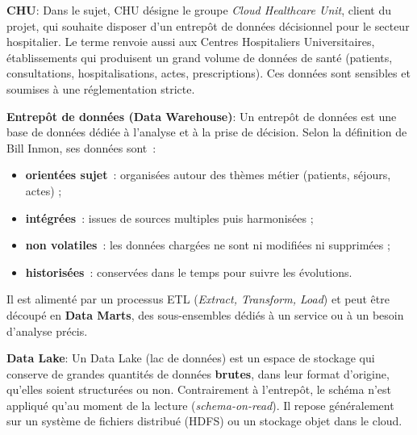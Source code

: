 \begin{center}
\end{center}

\separateur

\noindent \textbf{CHU}:
\noindent Dans le sujet, CHU désigne le groupe \textit{Cloud Healthcare Unit}, client du projet, qui souhaite disposer d'un entrepôt de données décisionnel pour le secteur hospitalier. Le terme renvoie aussi aux Centres Hospitaliers Universitaires, établissements qui produisent un grand volume de données de santé (patients, consultations, hospitalisations, actes, prescriptions). Ces données sont sensibles et soumises à une réglementation stricte.

\separateur

\noindent \textbf{Entrepôt de données (Data Warehouse)}:
\noindent Un entrepôt de données est une base de données dédiée à l'analyse et à la prise de décision. Selon la définition de Bill Inmon, ses données sont~:
\begin{itemize}
	\item \textbf{orientées sujet}~: organisées autour des thèmes métier (patients, séjours, actes) ;
	\item \textbf{intégrées}~: issues de sources multiples puis harmonisées ;
	\item \textbf{non volatiles}~: les données chargées ne sont ni modifiées ni supprimées ;
	\item \textbf{historisées}~: conservées dans le temps pour suivre les évolutions.
\end{itemize}
Il est alimenté par un processus ETL (\textit{Extract, Transform, Load}) et peut être découpé en \textbf{Data Marts}, des sous-ensembles dédiés à un service ou à un besoin d'analyse précis.

\separateur

\noindent \textbf{Data Lake}:
\noindent Un Data Lake (lac de données) est un espace de stockage qui conserve de grandes quantités de données \textbf{brutes}, dans leur format d'origine, qu'elles soient structurées ou non. Contrairement à l'entrepôt, le schéma n'est appliqué qu'au moment de la lecture (\textit{schema-on-read}). Il repose généralement sur un système de fichiers distribué (HDFS) ou un stockage objet dans le cloud.

